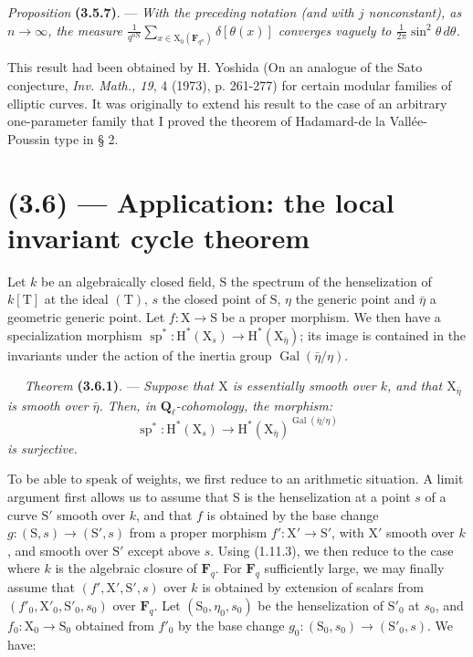 \documentclass[11pt,leqno]{article}
\newcommand{\Page}[1]{\ifvmode\noindent\else\unskip\ \fi{\footnotesize\textcolor{gray}{[p.\,#1]}}\ \ignorespaces}
\begin{document}
\textit{Proposition} \textbf{(3.5.7)}. — \textit{With the preceding notation (and with \(j\) nonconstant), as \(n\to\infty\), the measure \(\displaystyle\frac{1}{q^{n\mathrm N}}\sum_{x\in\mathrm X_0(\mathbf F_{q^n})}\delta[\theta(x)]\) converges vaguely to \(\displaystyle\frac{1}{2\pi}\sin^2\theta\,d\theta\).}

This result had been obtained by H. Yoshida (On an analogue of the Sato conjecture, \textit{Inv. Math., 19}, 4 (1973), p. 261-277) for certain modular families of elliptic curves. It was originally to extend his result to the case of an arbitrary one-parameter family that I proved the theorem of Hadamard-de la Vallée-Poussin type in § 2.

\section*{(3.6) — Application: the local invariant cycle theorem}

Let \(k\) be an algebraically closed field, \(\mathrm S\) the spectrum of the henselization of \(k[\mathrm T]\) at the ideal \((\mathrm T)\), \(s\) the closed point of \(\mathrm S\), \(\eta\) the generic point and \(\bar\eta\) a geometric generic point. Let \(f:\mathrm X\to\mathrm S\) be a proper morphism. We then have a specialization morphism \(\operatorname{sp}^*:\mathrm H^*(\mathrm X_s)\to\mathrm H^*(\mathrm X_{\bar\eta})\); its image is contained in the invariants under the action of the inertia group \(\operatorname{Gal}(\bar\eta/\eta)\).

\Page{213}
\textit{Theorem} \textbf{(3.6.1)}. — \textit{Suppose that \(\mathrm X\) is essentially smooth over \(k\), and that \(\mathrm X_{\bar\eta}\) is smooth over \(\bar\eta\). Then, in \(\mathbf Q_\ell\)-cohomology, the morphism:}
\[
\operatorname{sp}^*:\mathrm H^*(\mathrm X_s)\to
\mathrm H^*(\mathrm X_{\bar\eta})^{\operatorname{Gal}(\bar\eta/\eta)}
\]
\textit{is surjective.}

To be able to speak of weights, we first reduce to an arithmetic situation. A limit argument first allows us to assume that \(\mathrm S\) is the henselization at a point \(s\) of a curve \(\mathrm S'\) smooth over \(k\), and that \(f\) is obtained by the base change \(g:(\mathrm S,s)\to(\mathrm S',s)\) from a proper morphism \(f':\mathrm X'\to\mathrm S'\), with \(\mathrm X'\) smooth over \(k\), and smooth over \(\mathrm S'\) except above \(s\). Using (1.11.3), we then reduce to the case where \(k\) is the algebraic closure of \(\mathbf F_q\). For \(\mathbf F_q\) sufficiently large, we may finally assume that \((f',\mathrm X',\mathrm S',s)\) over \(k\) is obtained by extension of scalars from \((f'_0,\mathrm X'_0,\mathrm S'_0,s_0)\) over \(\mathbf F_q\). Let \((\mathrm S_0,\eta_0,s_0)\) be the henselization of \(\mathrm S'_0\) at \(s_0\), and \(f_0:\mathrm X_0\to\mathrm S_0\) obtained from \(f'_0\) by the base change \(g_0:(\mathrm S_0,s_0)\to(\mathrm S'_0,s)\). We have:
\end{document}
